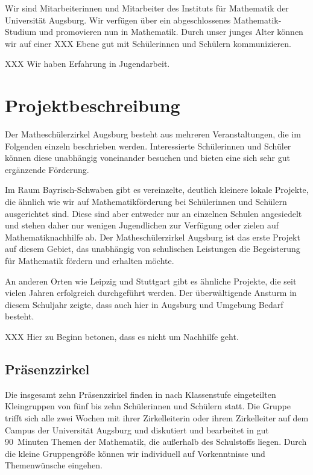 \documentclass[12pt]{zettel}
\begin{document}
Wir sind Mitarbeiterinnen und Mitarbeiter des Instituts für Mathematik der
Universität Augsburg. Wir verfügen über ein abgeschlossenes Mathematik-Studium
und promovieren nun in Mathematik. Durch unser junges Alter können wir auf
einer XXX Ebene gut mit Schülerinnen und Schülern kommunizieren.

XXX Wir haben Erfahrung in Jugendarbeit.


\section{Projektbeschreibung}

Der Matheschülerzirkel Augsburg besteht aus mehreren Veranstaltungen, die im
Folgenden einzeln beschrieben werden. Interessierte Schülerinnen und Schüler
können diese unabhängig voneinander besuchen und bieten eine sich sehr gut
ergänzende Förderung.

Im Raum Bayrisch-Schwaben gibt es vereinzelte, deutlich kleinere lokale
Projekte, die ähnlich wie wir auf Mathematikförderung bei Schülerinnen und
Schülern ausgerichtet sind. Diese sind aber entweder nur an einzelnen Schulen
angesiedelt und stehen daher nur wenigen Jugendlichen zur Verfügung oder zielen
auf Mathematiknachhilfe ab. Der Matheschülerzirkel Augsburg ist das erste
Projekt auf diesem Gebiet, das unabhängig von schulischen Leistungen die
Begeisterung für Mathematik fördern und erhalten möchte.

An anderen Orten wie Leipzig und Stuttgart gibt es ähnliche Projekte, die seit
vielen Jahren erfolgreich durchgeführt werden. Der überwältigende Ansturm in
diesem Schuljahr zeigte, dass auch hier in Augsburg und Umgebung Bedarf
besteht.

XXX Hier zu Beginn betonen, dass es nicht um Nachhilfe geht.


\subsection{Präsenzzirkel}

Die insgesamt zehn Präsenzzirkel finden in nach Klassenstufe eingeteilten
Kleingruppen von fünf bis zehn Schülerinnen und Schülern statt.
Die Gruppe trifft sich alle zwei Wochen mit ihrer Zirkelleiterin oder ihrem
Zirkelleiter auf dem Campus der Universität Augsburg und diskutiert und
bearbeitet in gut 90~Minuten Themen der Mathematik, die außerhalb des
Schulstoffs liegen. Durch die kleine Gruppengröße können wir individuell auf
Vorkenntnisse und Themenwünsche eingehen.
\end{document}
